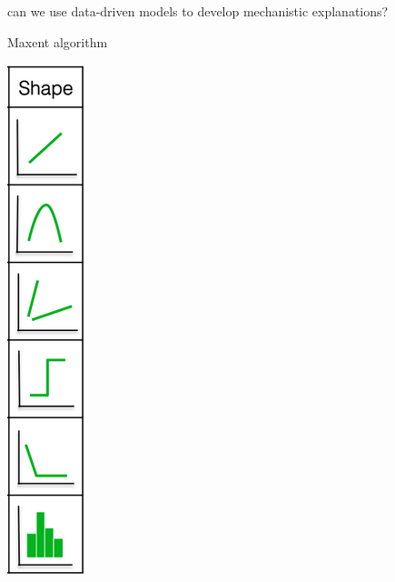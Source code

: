 \documentclass[
  ignorenonframetext,
]{beamer}
\begin{document}
\begin{frame}{can we use data-driven models to develop mechanistic
explanations?}
\begin{block}{Maxent algorithm}
\begin{flushright}\includegraphics[width=0.4\linewidth]{Maxent} \end{flushright}
\end{block}


\end{frame}
\end{document}
